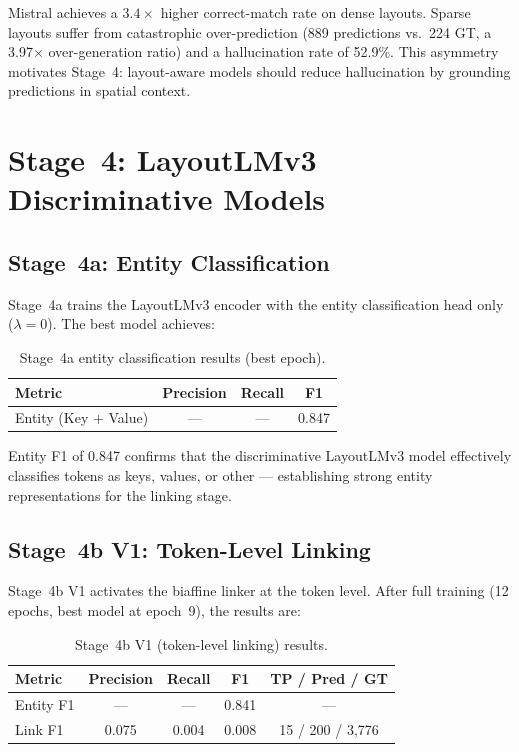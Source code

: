 Mistral achieves a $3.4\times$ higher correct-match rate on dense
layouts. Sparse layouts suffer from catastrophic over-prediction (889
predictions vs.\ 224 GT, a 3.97$\times$ over-generation ratio) and a
hallucination rate of 52.9\%. This asymmetry motivates Stage~4: layout-aware
models should reduce hallucination by grounding predictions in spatial context.

\section{Stage~4: LayoutLMv3 Discriminative Models}
\label{sec:stage4-results}

\subsection{Stage~4a: Entity Classification}

Stage~4a trains the LayoutLMv3 encoder with the entity classification head
only ($\lambda = 0$). The best model achieves:

\begin{table}[ht]
  \centering
  \caption{Stage~4a entity classification results (best epoch).}
  \label{tab:stage4a-results}
  \begin{tabular}{@{}lccc@{}}
    \toprule
    \textbf{Metric} & \textbf{Precision} & \textbf{Recall} & \textbf{F1} \\
    \midrule
    Entity (Key + Value) & --- & --- & 0.847 \\
    \bottomrule
  \end{tabular}
\end{table}

Entity F1 of 0.847 confirms that the discriminative LayoutLMv3 model
effectively classifies tokens as keys, values, or other --- establishing
strong entity representations for the linking stage.

\subsection{Stage~4b V1: Token-Level Linking}
\label{sec:v1-results}

Stage~4b V1 activates the biaffine linker at the token level. After full
training (12 epochs, best model at epoch~9), the results are:

\begin{table}[ht]
  \centering
  \caption{Stage~4b V1 (token-level linking) results.}
  \label{tab:v1-results}
  \begin{tabular}{@{}lcccc@{}}
    \toprule
    \textbf{Metric} & \textbf{Precision} & \textbf{Recall} & \textbf{F1} & \textbf{TP / Pred / GT} \\
    \midrule
    Entity F1 & --- & --- & 0.841 & --- \\
    Link F1   & 0.075 & 0.004 & 0.008 & 15 / 200 / 3{,}776 \\
    \bottomrule
  \end{tabular}
\end{table}

